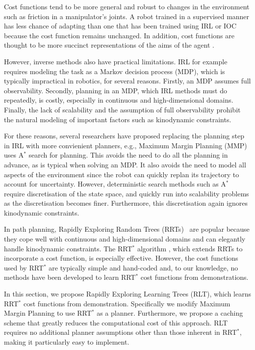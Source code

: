 \documentclass[a4paper,11pt]{report}
\begin{document}
Cost functions tend to be more general and robust to changes in the environment such as friction in a manipulator's joints. A robot trained in a supervised manner has less chance of adapting than one that has been trained using IRL or IOC because the cost function remains unchanged. In addition, cost functions are thought to be more succinct representations of the aims of the agent \cite{abbeel2004apprenticeship}. %

However, inverse methods also have practical limitations. IRL for example requires modeling the task as a Markov decision process (MDP), which is typically impractical in robotics, for several reasons.  Firstly, an MDP assumes full observability. Secondly, planning in an MDP, which IRL methods must do repeatedly, is costly, especially in continuous and high-dimensional domains. Finally, the lack of scalability and the assumption of full observability prohibit the natural modeling of important factors such as kinodynamic constraints. 

For these reasons, several researchers have proposed replacing the planning step in IRL with more convienient planners, e.g., Maximum Margin Planning (MMP)~\cite{ratliff2006maximum} uses A$^*$ search for planning. This avoids the need to do all the planning in advance, as is typical when solving an MDP. It also avoids the need to model all aspects of the environment since the robot can quickly replan its trajectory to account for uncertainty. However, deterministic search methods such as A$^*$ require discretisation of the state space, and quickly run into scalability problems as the discretisation becomes finer. Furthermore, this discretisation again ignores kinodynamic constraints.

In path planning, Rapidly Exploring Random Trees (RRTs)~\cite{lavalle1998rapidly} are popular because they cope well with continuous and high-dimensional domains and can elegantly handle kinodynamic constraints. The RRT$^*$ algorithm \cite{karaman2011sampling}, which extends RRTs to incorporate a cost function, is especially effective. However, the cost functions used by RRT$^*$ are typically simple and hand-coded and, to our knowledge, no methods have been developed to learn RRT$^*$ cost functions from demonstrations.


In this section, we propose Rapidly Exploring Learning Trees (RLT), which learns RRT$^*$ cost functions from demonstration. Specifically we modify Maximum Margin Planning to use RRT$^*$ as a planner. Furthermore, we propose a caching scheme that greatly reduces the computational cost of this approach. RLT requires no additional planner assumptions other than those inherent in RRT$^*$, making it particularly easy to implement. 
\end{document}
